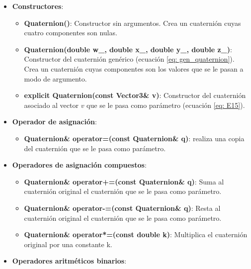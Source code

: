 \documentclass[12pt, a4paper]{report}
\begin{document}
\begin{itemize}

\item \textbf{Constructores}:

\begin{itemize}
\item \textbf{Quaternion()}: Constructor sin argumentos. Crea un cuaternión cuyas cuatro componentes son nulas.

\item \textbf{Quaternion(double w\_, double x\_, double y\_, double z\_)}: Constructor del cuaternión genérico (ecuación \eqref{eq: gen_quaternion}). Crea un cuaternión cuyas componentes son los valores que se le pasan a modo de argumento.

\item \textbf{explicit Quaternion(const Vector3\& v)}: Constructor del cuaternión asociado al vector $v$ que se le pasa como parámetro (ecuación \eqref{eq: E15}). 
\end{itemize}

\item \textbf{Operador de asignación}:

\begin{itemize}
\item \textbf{Quaternion\& operator=(const Quaternion\& q)}: realiza una copia del cuaternión que se le pasa como parámetro.
\end{itemize} 

\item \textbf{Operadores de asignación compuestos}:

\begin{itemize}
\item \textbf{Quaternion\& operator+=(const Quaternion\& q)}: Suma al cuaternión original el cuaternión que se le pasa como parámetro.
\item \textbf{Quaternion\& operator-=(const Quaternion\& q)}: Resta al cuaternión original el cuaternión que se le pasa como parámetro.
\item \textbf{Quaternion\& operator*=(const double k)}: Multiplica el cuaternión original por una constante k.

\end{itemize}

\item \textbf{Operadores aritméticos binarios}:


\end{itemize}
\end{document}
